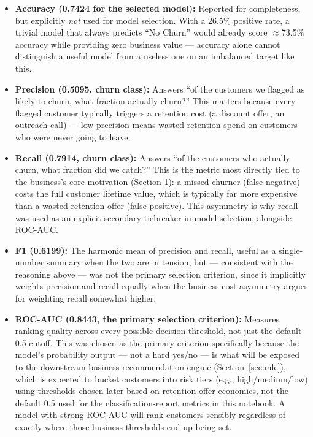 \documentclass[11pt]{article}
\begin{document}
\begin{itemize}[leftmargin=1.4em]
    \item \textbf{Accuracy (0.7424 for the selected model):} Reported for completeness, but explicitly \emph{not} used for model selection. With a 26.5\% positive rate, a trivial model that always predicts ``No Churn'' would already score $\approx$73.5\% accuracy while providing zero business value --- accuracy alone cannot distinguish a useful model from a useless one on an imbalanced target like this.
    \item \textbf{Precision (0.5095, churn class):} Answers ``of the customers we flagged as likely to churn, what fraction actually churn?'' This matters because every flagged customer typically triggers a retention cost (a discount offer, an outreach call) --- low precision means wasted retention spend on customers who were never going to leave.
    \item \textbf{Recall (0.7914, churn class):} Answers ``of the customers who actually churn, what fraction did we catch?'' This is the metric most directly tied to the business's core motivation (Section 1): a missed churner (false negative) costs the full customer lifetime value, which is typically far more expensive than a wasted retention offer (false positive). This asymmetry is why recall was used as an explicit secondary tiebreaker in model selection, alongside ROC-AUC.
    \item \textbf{F1 (0.6199):} The harmonic mean of precision and recall, useful as a single-number summary when the two are in tension, but --- consistent with the reasoning above --- was not the primary selection criterion, since it implicitly weights precision and recall equally when the business cost asymmetry argues for weighting recall somewhat higher.
    \item \textbf{ROC-AUC (0.8443, the primary selection criterion):} Measures ranking quality across every possible decision threshold, not just the default 0.5 cutoff. This was chosen as the primary criterion specifically because the model's probability output --- not a hard yes/no --- is what will be exposed to the downstream business recommendation engine (Section~\ref{sec:mle}), which is expected to bucket customers into risk tiers (e.g., high/medium/low) using thresholds chosen later based on retention-offer economics, not the default 0.5 used for the classification-report metrics in this notebook. A model with strong ROC-AUC will rank customers sensibly regardless of exactly where those business thresholds end up being set.
\end{itemize}
\end{document}
